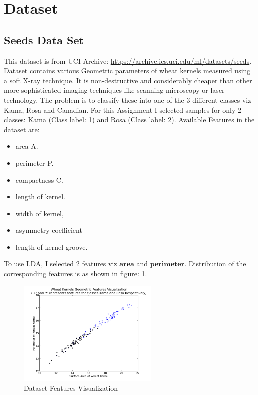 \documentclass[11pt, pdftex]{article}
\title{Assignment (MiniProject) #2}
\author{Machiry Aravind Kumar}
\date{UCSB}
\begin{document}
\maketitle
\section{Dataset}
\subsection{Seeds Data Set}
This dataset is from UCI Archive: \url{https://archive.ics.uci.edu/ml/datasets/seeds}. Dataset contains various Geometric parameters of wheat kernels measured using a soft X-ray technique. It is non-destructive and considerably cheaper than other more sophisticated imaging techniques like scanning microscopy or laser technology. The problem is to classify these into one of the 3 different classes viz  Kama, Rosa and Canadian. For this Assignment I selected samples for only 2 classes: Kama (Class label: 1) and Rosa (Class label: 2). Available Features in the dataset are:
\begin{itemize}
\item area A.
\item perimeter P.
\item compactness C.
\item length of kernel.
\item width of kernel,
\item asymmetry coefficient
\item length of kernel groove.
\end{itemize}
To use LDA, I selected 2 features viz $\textbf{area}$ and $\textbf{perimeter}$. Distribution of the corresponding features is as shown in figure: \ref{fig:seeds}.

\begin{figure}
    \centering
    \includegraphics[width=0.6\textwidth]{pics/FeaturesVisualization.png} 
    \caption{Dataset Features Visualization}
    \label{fig:seeds}
\end{figure}
\end{document}

